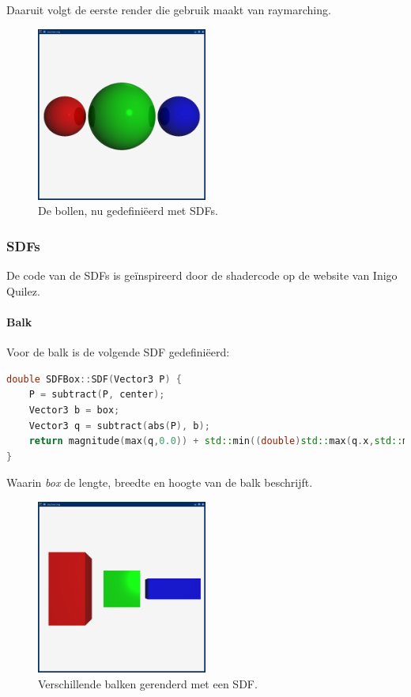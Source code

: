 \documentclass[12pt, a4paper]{article}
\begin{document}
Daaruit volgt de eerste render die gebruik maakt van raymarching.

\begin{figure}[H]
    \centering
    \includegraphics[width=0.50\textwidth]{renders/first_raymarched.png}
    \caption{De bollen, nu gedefiniëerd met SDFs.}
    \label{fig:first_raymarched}
\end{figure}

\clearpage

\subsubsection{SDFs}

De code van de SDFs is geïnspireerd door de shadercode op de website van Inigo Quilez\cite{SDFs}.

\paragraph{Balk}
Voor de balk is de volgende SDF gedefiniëerd:
\begin{lstlisting}[language=C++]
double SDFBox::SDF(Vector3 P) {
    P = subtract(P, center);
    Vector3 b = box;
    Vector3 q = subtract(abs(P), b);
    return magnitude(max(q,0.0)) + std::min((double)std::max(q.x,std::max(q.y,q.z)),0.0);
}
\end{lstlisting}
Waarin \emph{box} de lengte, breedte en hoogte van de balk beschrijft.

\begin{figure}[H]
    \centering
    \includegraphics[width=0.50\textwidth]{renders/boxes.png}
    \caption{Verschillende balken gerenderd met een SDF.}
    \label{fig:boxes}
\end{figure}
\end{document}
